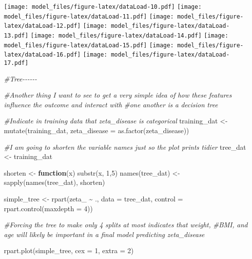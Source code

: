 \documentclass[
]{article}
\newenvironment{Shaded}{\begin{snugshade}}{\end{snugshade}}
\newcommand{\AttributeTok}[1]{\textcolor[rgb]{0.77,0.63,0.00}{#1}}
\newcommand{\CommentTok}[1]{\textcolor[rgb]{0.56,0.35,0.01}{\textit{#1}}}
\newcommand{\ControlFlowTok}[1]{\textcolor[rgb]{0.13,0.29,0.53}{\textbf{#1}}}
\newcommand{\DecValTok}[1]{\textcolor[rgb]{0.00,0.00,0.81}{#1}}
\newcommand{\FunctionTok}[1]{\textcolor[rgb]{0.00,0.00,0.00}{#1}}
\newcommand{\NormalTok}[1]{#1}
\newcommand{\OtherTok}[1]{\textcolor[rgb]{0.56,0.35,0.01}{#1}}
\newcommand{\SpecialCharTok}[1]{\textcolor[rgb]{0.00,0.00,0.00}{#1}}
\begin{document}
\texttt{[image: model\_files/figure-latex/dataLoad-10.pdf]}
\texttt{[image: model\_files/figure-latex/dataLoad-11.pdf]}
\texttt{[image: model\_files/figure-latex/dataLoad-12.pdf]}
\texttt{[image: model\_files/figure-latex/dataLoad-13.pdf]}
\texttt{[image: model\_files/figure-latex/dataLoad-14.pdf]}
\texttt{[image: model\_files/figure-latex/dataLoad-15.pdf]}
\texttt{[image: model\_files/figure-latex/dataLoad-16.pdf]}
\texttt{[image: model\_files/figure-latex/dataLoad-17.pdf]}

\begin{Shaded}
\begin{Highlighting}[]
\CommentTok{\#Tree{-}{-}{-}{-}{-}{-}}


\CommentTok{\#Another thing I want to see to get a very simple idea of how these features influence the outcome and interact with}
\CommentTok{\#one another is a decision tree}

\CommentTok{\#Indicate in training data that zeta\_disease is categorical}
\NormalTok{training\_dat }\OtherTok{\textless{}{-}} \FunctionTok{mutate}\NormalTok{(training\_dat, }\AttributeTok{zeta\_disease =} \FunctionTok{as.factor}\NormalTok{(zeta\_disease))}

\CommentTok{\#I am going to shorten the variable names just so the plot prints tidier}
\NormalTok{tree\_dat }\OtherTok{\textless{}{-}}\NormalTok{ training\_dat}

\NormalTok{shorten }\OtherTok{\textless{}{-}} \ControlFlowTok{function}\NormalTok{(x) }\FunctionTok{substr}\NormalTok{(x, }\DecValTok{1}\NormalTok{,}\DecValTok{5}\NormalTok{)}
\FunctionTok{names}\NormalTok{(tree\_dat) }\OtherTok{\textless{}{-}} \FunctionTok{sapply}\NormalTok{(}\FunctionTok{names}\NormalTok{(tree\_dat), shorten)}

\NormalTok{simple\_tree }\OtherTok{\textless{}{-}} \FunctionTok{rpart}\NormalTok{(zeta\_ }\SpecialCharTok{\textasciitilde{}}\NormalTok{ ., }\AttributeTok{data =}\NormalTok{ tree\_dat,}
                     \AttributeTok{control =} \FunctionTok{rpart.control}\NormalTok{(}\AttributeTok{maxdepth =} \DecValTok{4}\NormalTok{))}

\CommentTok{\#Forcing the tree to make only 4 splits at most indicates that weight, }
\CommentTok{\#BMI, and age will likely be important in a final model predicting zeta\_disease}

\FunctionTok{rpart.plot}\NormalTok{(simple\_tree, }\AttributeTok{cex =} \DecValTok{1}\NormalTok{, }\AttributeTok{extra =} \DecValTok{2}\NormalTok{)}
\end{Highlighting}
\end{Shaded}
\end{document}
